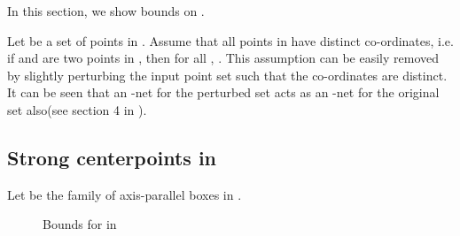 \noindent In this section, we show bounds on .

 Let  be a set of  points in . Assume that all points in 
have distinct co-ordinates, i.e. if  and  are two points in , then  for all , . This assumption can be easily removed by slightly perturbing the input point set such that the co-ordinates are distinct. It can be seen that an -net for the
perturbed set acts as an -net for the original set also(see section 4
in \cite{AAH09}). 

\subsection{Strong centerpoints in }
\noindent Let  be the family of axis-parallel boxes in .
\begin{thm}\label{ddim}
 
\end{thm}
\begin{figure}
\begin{center}
\caption{Bounds for  in }

\label{rect1}
\end{center}
\end{figure}
